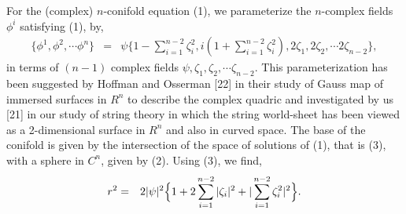 \documentclass[a4paper,12pt]{article}
\begin{document}
{\vspace{0.5cm}

For the (complex) $n$-conifold equation (1), we parameterize the $n$-complex 
fields ${\phi}^i$ satisfying (1), by,
\begin{eqnarray}
\{ {\phi}^1, {\phi}^2, \cdots {\phi}^n\} &=&\psi \bigl\{ 1-\sum_{i=1}^{n-2}
{\zeta}^2_i, i(1+\sum_{i=1}^{n-2}{\zeta}_i^2),2{\zeta}_1,2{\zeta}_2,
 \cdots 2{\zeta}_{n-2} \Bigr\},
\end{eqnarray}
in terms of $(n-1)$ complex fields $\psi, {\zeta}_1, {\zeta}_2,\cdots 
{\zeta}_{n-2}$. This parameterization has been suggested by Hoffman and 
Osserman [22] in their study of Gauss map of immersed surfaces in $R^n$ to 
describe the complex quadric and investigated by us [21] in our study 
of string theory in which the string world-sheet has been viewed as a 
2-dimensional surface in $R^n$ and also in curved space. The base of the 
conifold is given by the intersection of the space of solutions of (1), 
that is (3), with a sphere in $C^n$, given by (2). Using (3), we find,
\begin{eqnarray}
r^2 &=& 2|\psi |^2 \Bigl\{ 1+2\sum_{i=1}^{n-2}|{\zeta}_i|^2 + 
| \sum_{i=1}^{n-2}{\zeta}^2_i|^2 \Bigr\}.
\end{eqnarray}

\vspace{0.5cm}

}
\end{document}
